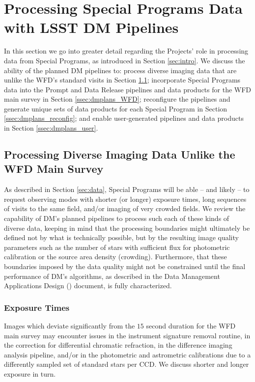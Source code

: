 \documentclass[DM,lsstdoc,toc]{lsstdoc}
\begin{document}
\section{Processing Special Programs Data with LSST DM Pipelines} \label{sec:dmplans}

In this section we go into greater detail regarding the Projects' role in processing data from Special Programs, as introduced in Section \ref{sec:intro}. We discuss the ability of the planned DM pipelines to: process diverse imaging data that are unlike the WFD's standard visits in Section \ref{ssec:dmplans_NSV}; incorporate Special Programs data into the Prompt and Data Release pipelines and data products for the WFD main survey in Section \ref{ssec:dmplans_WFD}; reconfigure the pipelines and generate unique sets of data products for each Special Program in Section \ref{ssec:dmplans_reconfig}; and enable user-generated pipelines and data products in Section \ref{ssec:dmplans_user}.

\subsection{Processing Diverse Imaging Data Unlike the WFD Main Survey}\label{ssec:dmplans_NSV}

As described in Section \ref{sec:data}, Special Programs will be able -- and likely -- to request observing modes with shorter (or longer) exposure times, long sequences of visits to the same field, and/or imaging of very crowded fields. We review the capability of DM's planned pipelines to process such each of these kinds of diverse data, keeping in mind that the processing boundaries might ultimately be defined not by what is technically possible, but by the resulting image quality parameters such as the number of stars with sufficient flux for photometric calibration or the source area density (crowding). Furthermore, that these boundaries imposed by the data quality might not be constrained until the final performance of DM's algorithms, as described in the Data Management Applications Design () document, is fully characterized.

\subsubsection{Exposure Times}\label{sssec:dmplans_NSV_expt}

Images which deviate significantly from the $15$ second duration for the WFD main survey may encounter issues in the instrument signature removal routine, in the correction for differential chromatic refraction, in the difference imaging analysis pipeline, and/or in the photometric and astrometric calibrations due to a differently sampled set of standard stars per CCD. We discuss shorter and longer exposure in turn.
\end{document}
